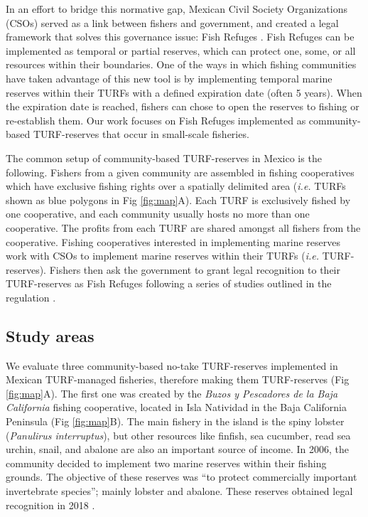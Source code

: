 \documentclass{frontiersSCNS}
\begin{document}
In an effort to bridge this normative gap, Mexican Civil Society
Organizations (CSOs) served as a link between fishers and government,
and created a legal framework that solves this governance issue: Fish
Refuges \citep{nom}. Fish Refuges can be implemented as temporal or
partial reserves, which can protect one, some, or all resources within
their boundaries. One of the ways in which fishing communities have
taken advantage of this new tool is by implementing temporal marine
reserves within their TURFs with a defined expiration date (often 5
years). When the expiration date is reached, fishers can chose to open
the reserves to fishing or re-establish them. Our work focuses on Fish
Refuges implemented as community-based TURF-reserves that occur in
small-scale fisheries.

The common setup of community-based TURF-reserves in Mexico is the
following. Fishers from a given community are assembled in fishing
cooperatives which have exclusive fishing rights over a spatially
delimited area (\emph{i.e.} TURFs shown as blue polygons in Fig
\ref{fig:map}A). Each TURF is exclusively fished by one cooperative, and
each community usually hosts no more than one cooperative. The profits
from each TURF are shared amongst all fishers from the cooperative.
Fishing cooperatives interested in implementing marine reserves work
with CSOs to implement marine reserves within their TURFs (\emph{i.e.}
TURF-reserves). Fishers then ask the government to grant legal
recognition to their TURF-reserves as Fish Refuges following a series of
studies outlined in the regulation \citep{nom}.

\hypertarget{study-areas}{%
\subsection{Study areas}\label{study-areas}}

We evaluate three community-based no-take TURF-reserves implemented in
Mexican TURF-managed fisheries, therefore making them TURF-reserves (Fig
\ref{fig:map}A). The first one was created by the \emph{Buzos y
Pescadores de la Baja California} fishing cooperative, located in Isla
Natividad in the Baja California Peninsula (Fig \ref{fig:map}B). The
main fishery in the island is the spiny lobster (\emph{Panulirus
interruptus}), but other resources like finfish, sea cucumber, read sea
urchin, snail, and abalone are also an important source of income. In
2006, the community decided to implement two marine reserves within
their fishing grounds. The objective of these reserves was ``to protect
commercially important invertebrate species''; mainly lobster and
abalone. These reserves obtained legal recognition in 2018
\citep{dof_website_2018}.
\end{document}

